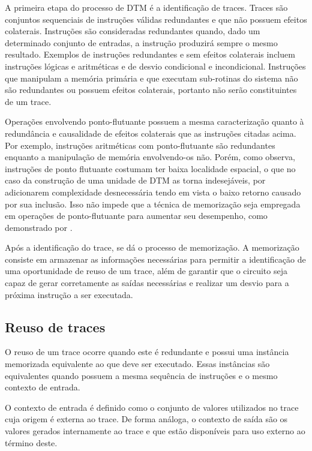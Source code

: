A primeira etapa do processo de DTM é a identificação de traces. Traces são conjuntos sequenciais de instruções válidas redundantes e que não possuem efeitos colaterais. Instruções são consideradas redundantes quando, dado um determinado conjunto de entradas, a instrução produzirá sempre o mesmo resultado. Exemplos de instruções redundantes e sem efeitos colaterais incluem instruções lógicas e aritméticas e de desvio condicional e incondicional. Instruções que manipulam a memória primária e que executam sub-rotinas do sistema não são redundantes ou possuem efeitos colaterais, portanto não serão constituintes de um trace.

Operações envolvendo ponto-flutuante possuem a mesma caracterização quanto à redundância e causalidade de efeitos colaterais que as instruções citadas acima. Por exemplo, instruções aritméticas com ponto-flutuante são redundantes enquanto a manipulação de memória envolvendo-os não. Porém, como  observa, instruções de ponto flutuante costumam ter baixa localidade espacial, o que no caso da construção de uma unidade de DTM as torna indesejáveis, por adicionarem complexidade desnecessária tendo em vista o baixo retorno causado por sua inclusão. Isso não impede que a técnica de memorização seja empregada em operações de ponto-flutuante para aumentar seu desempenho, como demonstrado por .

Após a identificação do trace, se dá o processo de memorização. A memorização consiste em armazenar as informações necessárias para permitir a identificação de uma oportunidade de reuso de um trace, além de garantir que o circuito seja capaz de gerar corretamente as saídas necessárias e realizar um desvio para a próxima instrução a ser executada.



\subsection{Reuso de traces}
\label{Fundamentacao:DTM:Reuso}

O reuso de um trace ocorre quando este é redundante e possui uma instância memorizada equivalente ao que deve ser executado. Essas instâncias são equivalentes quando possuem a mesma sequência de instruções e o mesmo contexto de entrada.

O contexto de entrada é definido como o conjunto de valores utilizados no trace cuja origem é externa ao trace. De forma análoga, o contexto de saída são os valores gerados internamente ao trace e que estão disponíveis para uso externo ao término deste.

